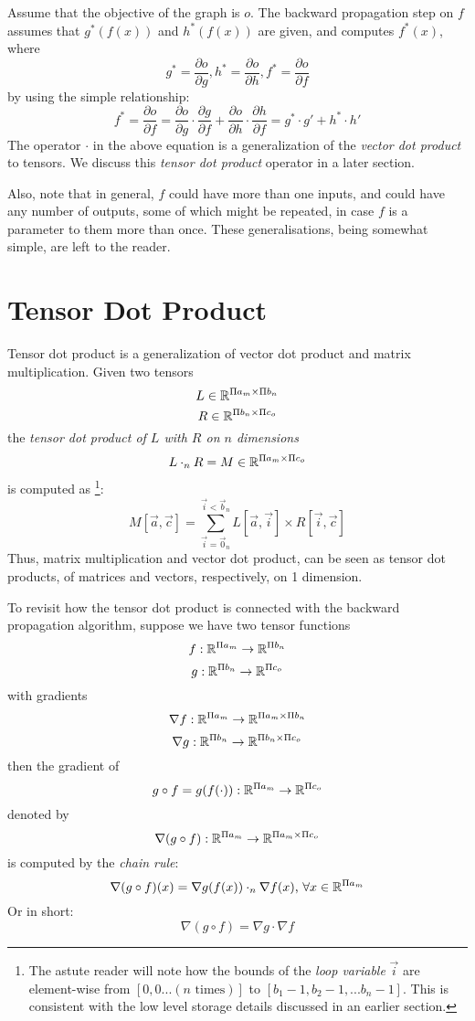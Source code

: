\documentclass{article}
\begin{document}
  Assume that the objective of the graph is $o$.
  The backward propagation step on $f$ assumes 
  that $g^*(f(x))$ and $h^*(f(x))$ are given, and computes $f^*(x)$,
  where
  \[ g^* = \frac{\partial o}{\partial g},
     h^* = \frac{\partial o}{\partial h}, 
     f^* = \frac{\partial o}{\partial f} 
  \]
  by using the simple relationship:
  \[ f^* = \frac{\partial o}{\partial f} 
         =   \frac{\partial o}{\partial g} \cdot \frac{\partial g}{\partial f}
           + \frac{\partial o}{\partial h} \cdot \frac{\partial h}{\partial f}
         = g^* \cdot g' + h^* \cdot h'
  \]
  The operator $\cdot$ in the above equation is a generalization 
  of the \emph{vector dot product} to tensors.
  We discuss this \emph{tensor dot product} operator
  in a later section.
  
  Also, note that in general, $f$ could have more than one inputs,
  and could have any number of outputs,
  some of which might be repeated,
  in case $f$ is a parameter to them more than once.
  These generalisations, being somewhat simple,
  are left to the reader.
  
\section{Tensor Dot Product}
  Tensor dot product is a generalization of vector dot product
  and matrix multiplication.
  Given two tensors 
  \[ L \in \mathbb{R}^{\Pi a_m \times \Pi b_n} \]
  \[ R \in \mathbb{R}^{\Pi b_n \times \Pi c_o} \]
  the \emph{tensor dot product of $L$ with $R$ on $n$ dimensions}
  \[ L \cdot_n R = M \in \mathbb{R}^{\Pi a_m \times \Pi c_o} \]
  is computed as \footnote{
   The astute reader will note how
   the bounds of the \emph{loop variable} $\overrightarrow i$
   are element-wise from 
   $[0, 0 ... (n \text{ times})]$ to 
   $[b_1 - 1, b_2 - 1, ... b_n - 1]$.
   This is consistent with the low level storage details
   discussed in an earlier section.
  }:
  \[ M[\overrightarrow{a}, \overrightarrow{c}] 
     = \sum_{\overrightarrow{i} = \overrightarrow{0}_n}
           ^{\overrightarrow{i} < \overrightarrow{b}_n}
            {L[\overrightarrow{a}, \overrightarrow{i}] 
             \times R[\overrightarrow{i}, \overrightarrow{c}]
            }
  \]
  Thus, matrix multiplication and vector dot product, 
  can be seen as tensor dot products, 
  of matrices and vectors, respectively,
  on 1 dimension.
  
  To revisit how the tensor dot product is connected 
  with the backward propagation algorithm,
  suppose we have two tensor functions
  \[ f: \mathbb{R}^{\Pi a_m} \rightarrow \mathbb{R}^{\Pi b_n} \]
  \[ g: \mathbb{R}^{\Pi b_n} \rightarrow \mathbb{R}^{\Pi c_o} \]
  with gradients
  \[ \nabla f: \mathbb{R}^{\Pi a_m} \rightarrow \mathbb{R}^{\Pi a_m \times \Pi b_n} \]
  \[ \nabla g: \mathbb{R}^{\Pi b_n} \rightarrow \mathbb{R}^{\Pi b_n \times \Pi c_o} \]
  then the gradient of
  \[ g \circ f = g(f(\cdot)): \mathbb{R}^{\Pi a_m} \rightarrow \mathbb{R}^{\Pi c_o} \]
  denoted by
  \[ \nabla (g \circ f): 
               \mathbb{R}^{\Pi a_m} \rightarrow \mathbb{R}^{\Pi a_m \times \Pi c_o} \]
  is computed by the \emph{chain rule}:
  \[ \nabla (g \circ f) (x) = \nabla g(f(x)) \cdot_n \nabla f(x)
     \text{, }\forall x \in \mathbb{R}^{\Pi a_m}
  \]
  Or in short:
  \[ \nabla(g \circ f) = \nabla g \cdot \nabla f \]
  
\end{document}
